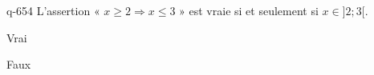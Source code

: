 \begin{truefalse}{q-654}
L'assertion « $x\geq 2 \Rightarrow x \leq 3$ » est vraie si et seulement si $x\in ]2;3[$.
\item Vrai
\item* Faux
\end{truefalse}

